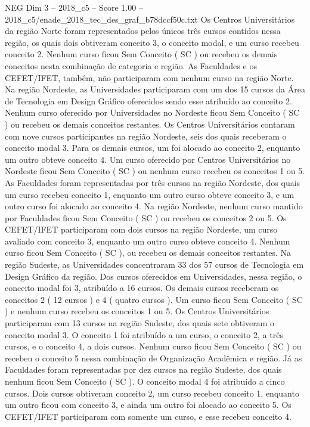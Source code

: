 \begin{textsample}{NEG Dim 3 – 2018\_c5 – Score 1.00 – 2018\_c5/enade\_2018\_tec\_des\_graf\_b78dccf50c.txt}
Os Centros Universitários da região Norte foram representados pelos únicos três cursos contidos nessa região, os quais dois obtiveram conceito 3, o conceito modal, e um curso recebeu conceito 2.
Nenhum curso ficou Sem Conceito ( SC ) ou recebeu os demais conceitos nesta combinação de categoria e região.
As Faculdades e os CEFET/IFET, também, não participaram com nenhum curso na região Norte.
Na região Nordeste, as Universidades participaram com um dos 15 cursos da Área de Tecnologia em Design Gráfico oferecidos sendo esse atribuído ao conceito 2.
Nenhum curso oferecido por Universidades no Nordeste ficou Sem Conceito ( SC ) ou recebeu os demais conceitos restantes.
Os Centros Universitários contaram com nove cursos participantes na região Nordeste, seis dos quais receberam o conceito modal 3.
Para os demais cursos, um foi alocado ao conceito 2, enquanto um outro obteve conceito 4.
Um curso oferecido por Centros Universitários no Nordeste ficou Sem Conceito ( SC ) ou nenhum curso recebeu os conceitos 1 ou 5.
As Faculdades foram representadas por três cursos na região Nordeste, dos quais um curso recebeu conceito 1, enquanto um outro curso obteve conceito 3, e um outro curso foi alocado ao conceito 4.
Na região Nordeste, nenhum curso mantido por Faculdades ficou Sem Conceito ( SC ) ou recebeu os conceitos 2 ou 5.
Os CEFET/IFET participaram com dois cursos na região Nordeste, um curso avaliado com conceito 3, enquanto um outro curso obteve conceito 4.
Nenhum curso ficou Sem Conceito ( SC ), ou recebeu os demais conceitos restantes.
Na região Sudeste, as Universidades concentraram 33 dos 57 cursos de Tecnologia em Design Gráfico da região.
Dos cursos oferecidos em Universidades, nessa região, o conceito modal foi 3, atribuído a 16 cursos.
Os demais cursos receberam os conceitos 2 ( 12 cursos ) e 4 ( quatro cursos ).
Um curso ficou Sem Conceito ( SC ) e nenhum curso recebeu os conceitos 1 ou 5.
Os Centros Universitários participaram com 13 cursos na região Sudeste, dos quais sete obtiveram o conceito modal 3.
O conceito 1 foi atribuído a um curso, o conceito 2, a três cursos, e o conceito 4, a dois cursos.
Nenhum curso ficou Sem Conceito ( SC ) ou recebeu o conceito 5 nessa combinação de Organização Acadêmica e região.
Já as Faculdades foram representadas por dez cursos na região Sudeste, dos quais nenhum ficou Sem Conceito ( SC ).
O conceito modal 4 foi atribuído a cinco cursos.
Dois cursos obtiveram conceito 2, um curso recebeu conceito 1, enquanto um outro ficou com conceito 3, e ainda um outro foi alocado ao conceito 5.
Os CEFET/IFET participaram com somente um curso, e esse recebeu conceito 4.

\end{textsample}
